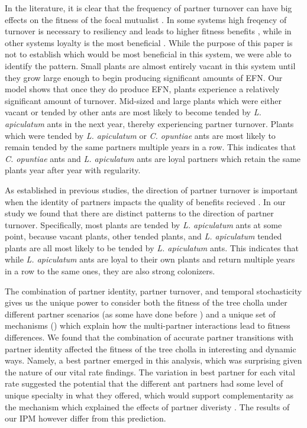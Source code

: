 \documentclass[11pt]{article}
\begin{document}
In the literature, it is clear that the frequency of partner turnover can have big effects on the fitness of the focal mutualist \cite{Fiala1994, Horvitz1986, Oliveira1999, Sachs2004}.
In some systems high freqency of turnover is necessary to resiliency and leads to higher fitness benefits \cite{Trojelsgaard2015}, while in other systems loyalty is the most beneficial \cite{Batstone2018}.
While the purpose of this paper is not to establish which would be most beneficial in this system, we were able to identify the pattern. 
Small plants are almost entirely vacant in this system until they grow large enough to begin producing significant amounts of EFN.
Our model shows that once they do produce EFN, plants experience a relatively significant amount of turnover.
Mid-sized and large plants which were either vacant or tended by other ants are most likely to become tended by \textit{L. apiculatum} ants in the next year, thereby experiencing partner turnover. 
Plants which were tended by \textit{L. apiculatum} or \textit{C. opuntiae} ants are most likely to remain tended by the same partners multiple years in a row. 
This indicates that \textit{C. opuntiae} ants and \textit{L. apiculatum} ants are loyal partners which retain the same plants year after year with regularity.


As established in previous studies, the direction of partner turnover is important when the identity of partners impacts the quality of benefits recieved \cite{Fonseca2003, Alonso1998, Dejean2008, Noe1994}.
In our study we found that there are distinct patterns to the direction of partner turnover. 
Specifically, most plants are tended by \textit{L. apiculatum} ants at some point, because vacant plants, other tended plants, and \textit{L. apiculatum} tended plants are all most likely to be tended by \textit{L. apiculatum} ants.
This indicates that while \textit{L. apiculatum} ants are loyal to their own plants and return multiple years in a row to the same ones, they are also strong colonizers. 


The combination of partner identity, partner turnover, and temporal stochasticity gives us the unique power to consider both the fitness of the tree cholla under different partner scenarios (as some have done before \cite{Palmer2010}) and a unique set of mechanisms (\cite{Batstone2018}) which explain how the multi-partner interactions lead to fitness differences. 
We found that the combination of accurate partner transitions with partner identity affected the fitness of the tree cholla in interesting and dynamic ways. 
Namely, a best partner emerged in this analysis, which was surprising given the nature of our vital rate findings. 
The variation in best partner for each vital rate suggested the potential that the different ant partners had some level of unique specialty in what they offered, which would support complementarity as the mechanism which explained the effects of partner diveristy \cite{Stachowicz2005, Stanton2003}. 
The results of our IPM however differ from this prediction. 
\end{document}
